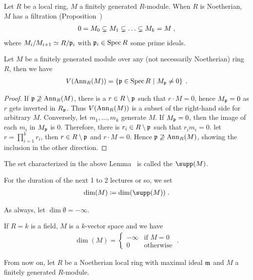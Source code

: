 \documentclass[a4paper,parskip=half,numbers=enddot, DIV=12]{scrreprt}
\begin{document}
Let $R$ be a local ring, $M$ a finitely generated $R$-module. When $R$ is Noetherian, $M$ has a filtration (Proposition~)
\begin{align}
    0 = M_0\subsetneq M_1\subsetneq\ldots \subsetneq M_k = M\;, \lbl{eq:filtrationByPrimeIdeals}
\end{align}
where $M_i/M_{i+1} \simeq R/\mathfrak{p}_i$ with $\mathfrak{p}_i\in\operatorname{Spec} R$ some prime ideals.

\begin{lem}
    Let $M$ be a finitely generated module over any (not necessarily Noetherian) ring $R$, then we have
    \begin{align*}
        V(\operatorname{Ann}_R(M)) = \left\{\mathfrak{p}\in \operatorname{Spec} R\ \middle|\  M_{\mathfrak{p}}\neq 0\right\}\;.
    \end{align*}
\end{lem}
\begin{proof}
    If $\mathfrak{p}\not\supseteq \operatorname{Ann}_R(M)$, there is a $r\in R\setminus \mathfrak{p}$ such that $r\cdot M = 0$, hence $M_{\mathfrak{p}}=0$ as $r$ gets inverted in $R_{\mathfrak{p}}$. Thus $V(\operatorname{Ann}_R(M))$ is a subset of the right-hand side for arbitrary $M$. Conversely, let $m_1,\ldots, m_k$ generate $M$. If $M_{\mathfrak{p}} = 0$, then the image of each $m_i$ in $M_{\mathfrak{p}}$ is $0$. Therefore, there is $r_i\in R\setminus \mathfrak{p}$ such that $r_im_i = 0$. let $r = \prod_{i=1}^k r_i$, then $r\in R\setminus \mathfrak{p}$ and $r\cdot M = 0$. Hence $\mathfrak{p}\not\supseteq \operatorname{Ann}_R(M)$, showing the inclusion in the other direction.
\end{proof}

\begin{defi}[Support]
    \begin{alphanumerate}
    \item 
        The set characterized in the above Lemma~ is called the  $\supp(M)$.
    \item  
        For the duration of  the next 1 to 2 lectures or so, we set 
        \begin{align*}
            \dim(M) \coloneqq \dim(\supp(M))\;.
        \end{align*}
    \end{alphanumerate}
\end{defi}
\begin{rem*}
    \begin{alphanumerate}
    \item 
        As always, let $\dim \emptyset = -\infty$.
    \item
        If $R=k$ is a field, $M$ is a $k$-vector space and we have
        \begin{align*}
            \dim(M) = \begin{cases}-\infty & \text{if } M=0 \\ 0 &\text{otherwise}\end{cases}\;.
        \end{align*}
    \end{alphanumerate}
\end{rem*}
From now on, let $R$ be a Noetherian local ring with maximal ideal $\mathfrak{m}$ and $M$ a finitely generated $R$-module.
\end{document}
